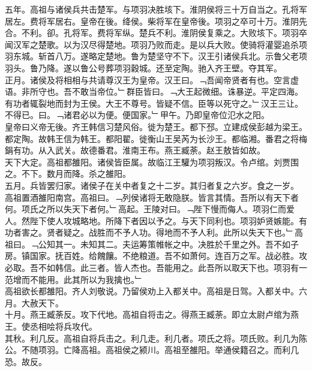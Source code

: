 \documentclass{zhvt-classic}
\begin{document}
\hspace*{2em}五年。高祖与诸侯兵共击楚军。与项羽决胜垓下。淮阴侯将三十万自当之。孔将军居左。费将军居右。皇帝在後。绛侯。柴将军在皇帝後。项羽之卒可十万。淮阴先合。不利。卻。孔将军。费将军纵。楚兵不利。淮阴侯复乘之。大败垓下。项羽卒闻汉军之楚歌。以为汉尽得楚地。项羽乃败而走。是以兵大败。使骑将灌婴追杀项羽东城。斩首八万。遂略定楚地。鲁为楚坚守不下。汉王引诸侯兵北。示鲁父老项羽头。鲁乃降。遂以鲁公号葬项羽穀城。还至定陶。驰入齐王壁。夺其军。\\
\hspace*{2em}正月。诸侯及将相相与共请尊汉王为皇帝。汉王曰。﹁吾闻帝贤者有也。空言虚语。非所守也。吾不敢当帝位。﹂群臣皆曰。﹁大王起微细。诛暴逆。平定四海。有功者辄裂地而封为王侯。大王不尊号。皆疑不信。臣等以死守之。﹂汉王三让。不得已。曰。﹁诸君必以为便。便国家。﹂甲午。乃即皇帝位氾水之阳。\\
\hspace*{2em}皇帝曰义帝无後。齐王韩信习楚风俗。徙为楚王。都下邳。立建成侯彭越为梁王。都定陶。故韩王信为韩王。都阳翟。徙衡山王吴芮为长沙王。都临湘。番君之将梅鋗有功。从入武关。故德番君。淮南王布。燕王臧荼。赵王敖皆如故。\\
\hspace*{2em}天下大定。高祖都雒阳。诸侯皆臣属。故临江王驩为项羽叛汉。令卢绾。刘贾围之。不下。数月而降。杀之雒阳。\\
\hspace*{2em}五月。兵皆罢归家。诸侯子在关中者复之十二岁。其归者复之六岁。食之一岁。\\
\hspace*{2em}高祖置酒雒阳南宫。高祖曰。﹁列侯诸将无敢隐朕。皆言其情。吾所以有天下者何。项氏之所以失天下者何。﹂高起。王陵对曰。﹁陛下慢而侮人。项羽仁而爱人。然陛下使人攻城略地。所降下者因以予之。与天下同利也。项羽妒贤嫉能。有功者害之。贤者疑之。战胜而不予人功。得地而不予人利。此所以失天下也。﹂高祖曰。﹁公知其一。未知其二。夫运筹策帷帐之中。决胜於千里之外。吾不如子房。镇国家。抚百姓。给餽饟。不绝粮道。吾不如萧何。连百万之军。战必胜。攻必取。吾不如韩信。此三者。皆人杰也。吾能用之。此吾所以取天下也。项羽有一范增而不能用。此其所以为我擒也。﹂\\
\hspace*{2em}高祖欲长都雒阳。齐人刘敬说。乃留侯劝上入都关中。高祖是日驾。入都关中。六月。大赦天下。\\
\hspace*{2em}十月。燕王臧荼反。攻下代地。高祖自将击之。得燕王臧荼。即立太尉卢绾为燕王。使丞相哙将兵攻代。\\
\hspace*{2em}其秋。利几反。高祖自将兵击之。利几走。利几者。项氏之将。项氏败。利几为陈公。不随项羽。亡降高祖。高祖侯之颍川。高祖至雒阳。举通侯籍召之。而利几恐。故反。\\
\end{document}
